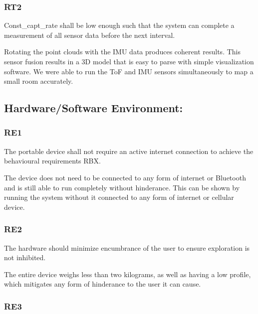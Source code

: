 \documentclass[11pt]{article}
\begin{document}
	\subsubsection{RT2}
	
	\begin{exampleblock}
		Const\_capt\_rate shall be low enough such that the system can complete a measurement of all sensor data before the next interval.
	\end{exampleblock}
	
	Rotating the point clouds with the IMU data produces coherent results. This sensor fusion results in a 3D model that is easy to parse with simple visualization software. We were able to run the ToF and IMU sensors simultaneously to map a small room accurately. 
	
	
	\subsection{Hardware/Software Environment: }
	
	\subsubsection{RE1}  
	
	\begin{exampleblock}
		The portable device shall not require an active internet connection to achieve the behavioural requirements RBX.
	\end{exampleblock}
	
	The device does not need to be connected to any form of internet or Bluetooth and is still able to run completely without hinderance. This can be shown by running the system without it connected to any form of internet or cellular device. 
	
	\subsubsection{RE2} 
	
	\begin{exampleblock}
		The hardware should minimize encumbrance of the user to ensure exploration is not inhibited.
	\end{exampleblock}
	
	The entire device weighs less than two kilograms, as well as having a low profile, which mitigates any form of hinderance to the user it can cause.

    \subsubsection{RE3}
\end{document}
